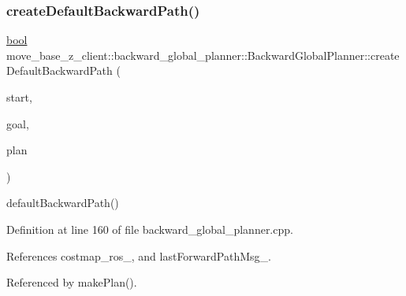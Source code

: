 \subsubsection{\texorpdfstring{create\+Default\+Backward\+Path()}{createDefaultBackwardPath()}}
{\footnotesize\ttfamily \hyperlink{classbool}{bool} move\+\_\+base\+\_\+z\+\_\+client\+::backward\+\_\+global\+\_\+planner\+::\+Backward\+Global\+Planner\+::create\+Default\+Backward\+Path (\begin{DoxyParamCaption}\item[{const geometry\+\_\+msgs\+::\+Pose\+Stamped \&}]{start,  }\item[{const geometry\+\_\+msgs\+::\+Pose\+Stamped \&}]{goal,  }\item[{std\+::vector$<$ geometry\+\_\+msgs\+::\+Pose\+Stamped $>$ \&}]{plan }\end{DoxyParamCaption})\hspace{0.3cm}{\ttfamily [virtual]}}

default\+Backward\+Path() 

Definition at line 160 of file backward\+\_\+global\+\_\+planner.\+cpp.



References costmap\+\_\+ros\+\_\+, and last\+Forward\+Path\+Msg\+\_\+.



Referenced by make\+Plan().


